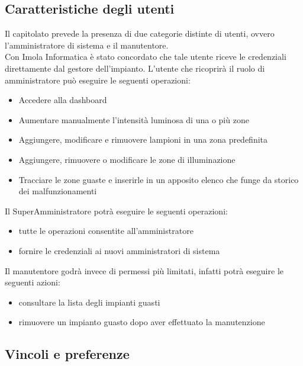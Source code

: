 \documentclass[12pt]{article}
\begin{document}
\subsection{Caratteristiche degli utenti}
Il capitolato prevede la presenza di due categorie distinte di utenti, ovvero l'amministratore di sistema e il manutentore. \\
Con Imola Informatica è stato concordato che tale utente riceve le credenziali direttamente dal gestore dell'impianto.
L'utente che ricoprirà il ruolo di amministratore può eseguire le seguenti operazioni:
\begin{itemize}
	\item Accedere alla dashboard
	\item Aumentare manualmente l'intensità luminosa di una o più zone
	\item Aggiungere, modificare e rimuovere lampioni in una zona predefinita
	\item Aggiungere, rimuovere o modificare le zone di illuminazione
	\item Tracciare le zone guaste e inserirle in un apposito elenco che funge da storico dei malfunzionamenti
\end{itemize}
Il SuperAmministratore potrà eseguire le seguenti operazioni:
\begin{itemize}
	\item tutte le operazioni consentite all'amministratore
	\item fornire le credenziali ai nuovi amministratori di sistema
\end{itemize}
Il manutentore godrà invece di permessi più limitati, infatti potrà eseguire le seguenti azioni:
\begin{itemize}
	\item consultare la lista degli impianti guasti
	\item rimuovere un impianto guasto dopo aver effettuato la manutenzione
\end{itemize}
\subsection{Vincoli e preferenze}
\end{document}
